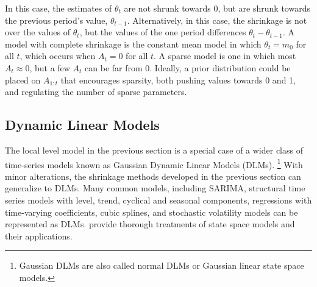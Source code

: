 \documentclass{article}
\begin{document}
In this case, the estimates of $\theta_{t}$ are not shrunk towards 0, but are shrunk towards the previous period's value, $\theta_{t-1}$.
Alternatively, in this case, the shrinkage is not over the values of $\theta_{t}$, but the values of the one period differences $\theta_{t} - \theta_{t -1}$.
A model with complete shrinkage is the constant mean model in which $\theta_{t} = m_{0}$ for all $t$, which occurs when $A_{t} = 0$ for all $t$.
A sparse model is one in which most $A_{t} \approx 0$, but a few $A_{t}$ can be far from 0.
Ideally, a prior distribution could be placed on $A_{1:t}$ that encourages sparsity, both pushing values towards 0 and 1, and regulating the number of sparse parameters.

\subsection{Dynamic Linear Models}
\label{sec:dynam-line-models}

The local level model in the previous section is a special case of a wider class of time-series models known as Gaussian Dynamic Linear Models (DLMs).%
\footnote{Gaussian DLMs are also called normal DLMs or Gaussian linear state space models.}
With minor alterations, the shrinkage methods developed in the previous section can generalize to DLMs.
Many common models, including SARIMA, structural time series models with level, trend, cyclical and seasonal components, regressions with time-varying coefficients, cubic splines, and stochastic volatility models can be represented as DLMs. 
\textcites{WestHarrison1997}{DurbinKoopman2001}{CommandeurKoopman2007}{PetrisPetroneOmegal2009}{ShumwayStoffer2010} provide thorough treatments of state space models and their applications.
\end{document}
